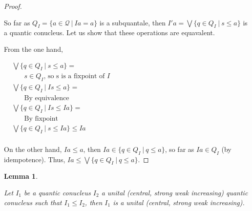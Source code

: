 \documentclass[a4paper]{article}
\theoremstyle{defin}
\theoremstyle{theorem}
\theoremstyle{prop}
\theoremstyle{lemma}
\newtheorem{lemma}{Lemma}
\theoremstyle{ex}
\theoremstyle{col}
\begin{document}
\begin{proof}
$ $

So far as $Q_{I} = \{ a \in \mathcal{Q} \: | \: I a = a \}$ is a subquantale, then $I' a = \bigvee \{ q \in Q_{I} \: | \: s \leq a \}$ is a quantic conucleus. Let us show that these operations are equavalent.

From the one hand,

$\begin{array}{lll}
&\bigvee \{ q \in Q_{I} \: | \: s \leq a \} = & \\
& \:\:\:\:\:\:\:\: \text{$s \in Q_{I}$, so s is a fixpoint of $I$} & \\
&\bigvee \{ q \in Q_{I} \: | \: I s \leq a \} = & \\
& \:\:\:\:\:\:\:\: \text{By equivalence}& \\
&\bigvee \{ q \in Q_{I} \: | \: I s \leq I a \} = & \\
& \:\:\:\:\:\:\:\: \text{By fixpoint} & \\
&\bigvee \{ q \in Q_{I} \: | \: s \leq I a \} \leq I a& \\
\end{array}$

On the other hand, $I a \leq a$, then $I a \in \{ q \in Q_{I} \: | \: q \leq a \}$, so far as $I a \in Q_{I}$ (by idempotence). Thus, $I a \leq \bigvee \{ q \in Q_{I} \: | \: q \leq a \}$.

\end{proof}

\begin{lemma}
$ $

Let $I_1$ be a quantic conucleus $I_2$ a unital (central, strong weak increasing) quantic conucleus such that $I_1 \leq I_2$,
then $I_1$ is a unital (central, strong weak increasing).

\end{lemma}
\end{document}
